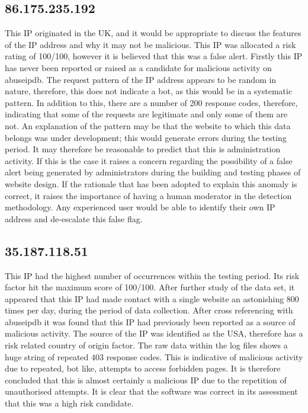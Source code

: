 \subsection*{86.175.235.192}

This IP originated in the UK, and it would be appropriate to discuss the features of the IP address and why it may not be malicious. This IP was allocated a risk rating of 100/100, however it is believed that this was a false alert. Firstly this IP has never been reported or raised as a candidate for malicious activity on abuseipdb. The request pattern of the IP address appears to be random in nature, therefore, this does not indicate a bot, as this would be in a systematic pattern. In addition to this, there are a number of 200 response codes, therefore, indicating that some of the requests are legitimate and only some of them are not. An explanation of the pattern may be that the website to which this data belongs was under development; this would generate errors during the testing period. It may therefore be reasonable to predict that this is administration activity. If this is the case it raises a concern regarding the possibility of a false alert being generated by administrators during the building and testing phases of website design. If the rationale that has been adopted to explain this anomaly is correct, it raises the importance of having a human moderator in the detection methodology. Any experienced user would be able to identify their own IP address and de-escalate this false flag.

\subsection*{35.187.118.51}

This IP had the highest number of occurrences within the testing period. Its risk factor hit the maximum score of 100/100. After further study of the data set, it appeared that this IP had made contact with a single website an astonishing 800 times per day, during the period of data collection. After cross referencing with abuseipdb it was found that this IP had previously been reported as a source of malicious activity. The source of the IP was identified as the USA, therefore has a risk related country of origin factor. The raw data within the log files shows a huge string of repeated 403 response codes. This is indicative of malicious activity due to repeated, bot like, attempts to access forbidden pages. It is therefore concluded that this is almost certainly a malicious IP due to the repetition of unauthorised attempts. It is clear that the software was correct in its assessment that this was a high risk candidate.
